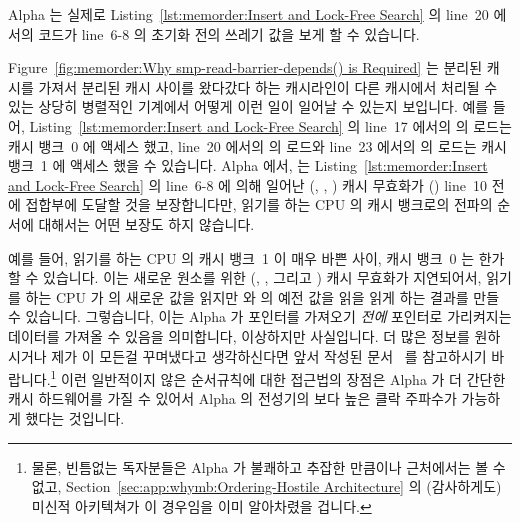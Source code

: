Alpha 는 실제로
Listing~\ref{lst:memorder:Insert and Lock-Free Search} 의 line~20 에서의 코드가
line~6-8 의 초기화 전의 쓰레기 값을 보게 할 수 있습니다.

Figure~\ref{fig:memorder:Why smp-read-barrier-depends() is Required}
는 분리된 캐시를 가져서 분리된 캐시 사이를 왔다갔다 하는 캐시라인이 다른
캐시에서 처리될 수 있는 상당히 병렬적인 기계에서 어떻게 이런 일이 일어날 수
있는지 보입니다.
예를 들어,
Listing~\ref{lst:memorder:Insert and Lock-Free Search}
의 line~17 에서의  의 로드는 캐시 뱅크~0 에 액세스 했고, line~20
에서의  의 로드와 line~23 에서의  의 로드는 캐시 뱅크~1
에 액세스 했을 수 있습니다.
Alpha 에서,  는
Listing~\ref{lst:memorder:Insert and Lock-Free Search} 의 line~6-8 에 의해
일어난 (, , ) 캐시 무효화가 ()
line~10 전에 접합부에 도달할 것을 보장합니다만, 읽기를 하는 CPU 의 캐시
뱅크로의 전파의 순서에 대해서는 어떤 보장도 하지 않습니다.

예를 들어, 읽기를 하는 CPU 의 캐시 뱅크~1 이 매우 바쁜 사이, 캐시 뱅크~0 는
한가할 수 있습니다.
이는 새로운 원소를 위한 (, , 그리고 ) 캐시
무효화가 지연되어서, 읽기를 하는 CPU 가  의 새로운 값을 읽지만
 와  의 예전 값을 읽을 읽게 하는 결과를 만들 수
있습니다.
그렇습니다, 이는 Alpha 가 포인터를 가져오기 {\em 전에} 포인터로 가리켜지는
데이터를 가져올 수 있음을 의미합니다, 이상하지만 사실입니다.
더 많은 정보를 원하시거나 제가 이 모든걸 꾸며냈다고 생각하신다면 앞서 작성된
문서~\cite{Compaq01,WilliamPugh2000Gharachorloo} 를 참고하시기
바랍니다.\footnote{
	물론, 빈틈없는 독자분들은 Alpha 가 불쾌하고 추잡한 만큼이나 근처에서는
	볼 수 없고, Section~\ref{sec:app:whymb:Ordering-Hostile Architecture}
	의 (감사하게도) 미신적 아키텍쳐가 이 경우임을 이미 알아차렸을 겁니다.}
이런 일반적이지 않은 순서규칙에 대한 접근법의 장점은 Alpha 가 더 간단한 캐시
하드웨어를 가질 수 있어서 Alpha 의 전성기의 보다 높은 클락 주파수가 가능하게
했다는 것입니다.
\iffalse

